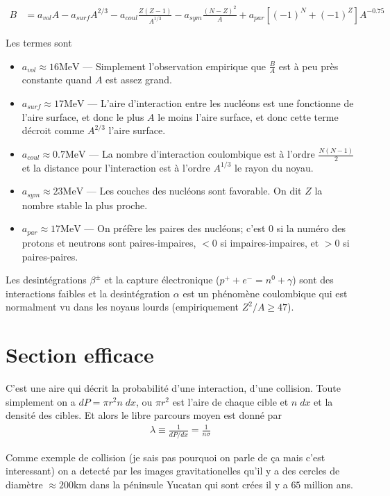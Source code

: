 \documentclass[10pt]{report}
\begin{document}
\begin{align}
    B &= a_{vol}A - a_{surf}A^{2/3} - a_{coul}\frac{Z(Z-1)}{A^{1/3}} - a_{sym}\frac{(N - Z)^2}{A} + a_{par}\left[ (-1)^N + (-1)^Z \right]A^{-0.75}
\end{align}

Les termes sont
\begin{itemize}
    \item $a_{vol} \approx 16\mathrm{MeV}$ --- Simplement l'observation empirique que $\frac{B}{A}$ est \`a peu pr\`es constante quand $A$ est assez grand.
    \item $a_{surf} \approx 17\mathrm{MeV}$ --- L'aire d'interaction entre les nucl\'eons est une fonctionne de l'aire surface, et donc le plus $A$ le moins l'aire surface, et donc cette terme d\'ecroit comme $A^{2/3}$ l'aire surface.
    \item $a_{coul} \approx 0.7\mathrm{MeV}$ --- La nombre d'interaction coulombique est \`a l'ordre $\frac{N(N-1)}{2}$ et la distance pour l'interaction est \`a l'ordre $A^{1/3}$ le rayon du noyau.
    \item $a_{sym} \approx 23\mathrm{MeV}$ --- Les couches des nucl\'eons sont favorable. On dit $Z$ la nombre stable la plus proche.
    \item $a_{par} \approx 17\mathrm{MeV}$ --- On pr\'ef\`ere les paires des nucl\'eons; c'est $0$ si la num\'ero des protons et neutrons sont paires-impaires, $<0$ si impaires-impaires, et $> 0$ si paires-paires.
\end{itemize}

Les desint\'egrations $\beta^{\pm}$ et la capture \'electronique ($p^+ + e^- = n^0 + \gamma$) sont des interactions faibles et la desint\'egration $\alpha$ est un ph\'enom\`ene coulombique qui est normalment vu dans les noyaus lourds (empiriquement $Z^2/A \geq 47$).

\section{Section efficace}

C'est une aire qui d\'ecrit la probabilit\'e d'une interaction, d'une collision. Toute simplement on a $dP = \pi r^2 n \;dx$, ou $\pi r^2$ est l'aire de chaque cible et $n \;dx$ et la densit\'e des cibles. Et alors le libre parcours moyen est donn\'e par 
\begin{align}
    \lambda \equiv \frac{1}{dP/dx} = \frac{1}{n\sigma}
\end{align}

Comme exemple de collision (je sais pas pourquoi on parle de \c{c}a mais c'est interessant) on a detect\'e par les images gravitationelles qu'il y a des cercles de diam\`etre $\approx 200\mathrm{km}$ dans la p\'eninsule Yucatan qui sont cr\'ees il y a $65$ million ans.
\end{document}
